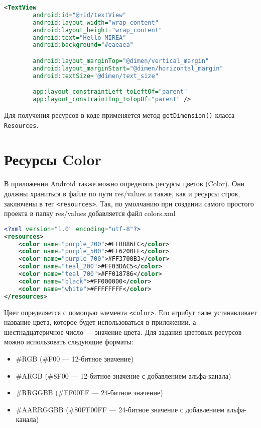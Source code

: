 \begin{lstlisting}[language=xml, caption=\leftline{Использование ресурсов dimension в XML-коде}, label=lst:xml:dimension:use]
<TextView
        android:id="@+id/textView"
        android:layout_width="wrap_content"
        android:layout_height="wrap_content"
        android:text="Hello MIREA"
        android:background="#eaeaea"

        android:layout_marginTop="@dimen/vertical_margin"
        android:layout_marginStart="@dimen/horizontal_margin"
        android:textSize="@dimen/text_size"

        app:layout_constraintLeft_toLeftOf="parent"
        app:layout_constraintTop_toTopOf="parent" />
\end{lstlisting}

Для получения ресурсов в коде применяется метод \texttt{getDimension()}
класса \texttt{Resources}.

\section{Ресурсы Color}
В приложении Android также можно определять ресурсы цветов (Color). Они
должны храниться в файле по пути res/values и также, как и ресурсы строк,
заключены в тег \texttt{<resources>}. Так, по умолчанию при создании самого
простого проекта в папку res/values добавляется файл colors.xml

\begin{lstlisting}[language=xml, caption=\leftline{Объявление ресурсов colors}, label=lst:xml:color]
<?xml version="1.0" encoding="utf-8"?>
<resources>
    <color name="purple_200">#FFBB86FC</color>
    <color name="purple_500">#FF6200EE</color>
    <color name="purple_700">#FF3700B3</color>
    <color name="teal_200">#FF03DAC5</color>
    <color name="teal_700">#FF018786</color>
    <color name="black">#FF000000</color>
    <color name="white">#FFFFFFFF</color>
</resources>
\end{lstlisting}


Цвет определяется с помощью элемента \texttt{<color>}. Его атрибут
\texttt{name} устанавливает название цвета, которое будет использоваться
в приложении, а шестнадцатеричное число --- значение цвета.
Для задания цветовых ресурсов можно использовать следующие форматы:

\begin{itemize}
	\item \#RGB (\#F00 --- 12-битное значение)
	\item \#ARGB (\#8F00 --- 12-битное значение с добавлением альфа-канала)
	\item \#RRGGBB (\#FF00FF --- 24-битное значение)
	\item \#AARRGGBB (\#80FF00FF --- 24-битное значение с добавлением
		альфа-канала)
\end{itemize}


